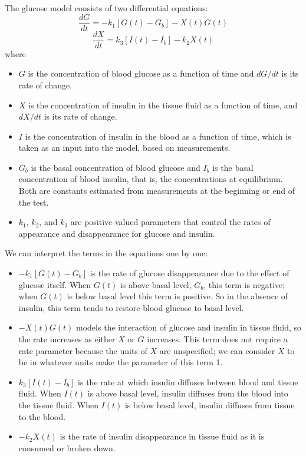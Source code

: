 \documentclass[12pt]{book}
\theoremstyle{exercise}
\begin{document}

The glucose model consists of two differential equations:
%
\[ \frac{dG}{dt} = -k_1 \left[ G(t) - G_b \right] - X(t) G(t)  \]
%
\[ \frac{dX}{dt} = k_3 \left[I(t) - I_b \right] - k_2 X(t) \]
%
where

\begin{itemize}

\item $G$ is the concentration of blood glucose as a function of time and $dG/dt$ is its rate of change.

\item $X$ is the concentration of insulin in the tissue fluid as a function of time, and $dX/dt$ is its rate of change.

\item $I$ is the concentration of insulin in the blood as a function of time, which is taken as an input into the model, based on measurements.

\item $G_b$ is the basal concentration of blood glucose and $I_b$ is the basal concentration of blood insulin, that is, the concentrations at equilibrium.  Both are constants estimated from measurements at the beginning or end of the test.

\item $k_1$, $k_2$, and $k_3$ are positive-valued parameters that control the rates of appearance and disappearance for glucose and insulin. 

\end{itemize}

We can interpret the terms in the equations one by one:

\begin{itemize}

\item $-k_1 \left[ G(t) - G_b \right]$ is the rate of glucose disappearance due to the effect of glucose itself.  When $G(t)$ is above basal level, $G_b$, this term is negative; when $G(t)$ is below basal level this term is positive.  So in the absence of insulin, this term tends to restore blood glucose to basal level.

\item $-X(t) G(t)$ models the interaction of glucose and insulin in tissue fluid, so the rate increases as either $X$ or $G$ increases.  This term does not require a rate parameter because the units of $X$ are unspecified; we can consider $X$ to be in whatever units make the parameter of this term 1.

\item $k_3 \left[ I(t) - I_b \right]$ is the rate at which insulin diffuses between blood and tissue fluid.  When $I(t)$ is above basal level, insulin diffuses from the blood into the tissue fluid.  When $I(t)$ is below basal level, insulin diffuses from tissue to the blood.

\item $-k_2 X(t)$ is the rate of insulin disappearance in tissue fluid as it is consumed or broken down.

\end{itemize}
\end{document}
